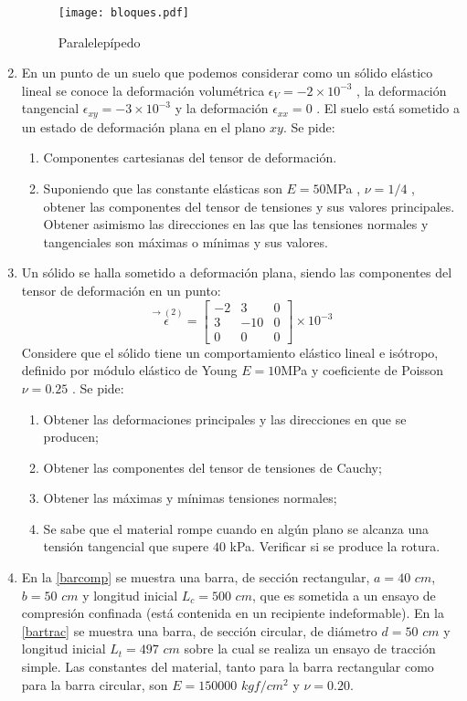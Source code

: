 \documentclass[../notas medios.tex]{subfiles}
\begin{document}
\begin{enumerate}
\begin{figure}[h]
	\centering
	\texttt{[image: bloques.pdf]} 
	\caption{Paralelepípedo}
	\label{bloques}
\end{figure}

\item \label{punto06_m} En un punto de un suelo que podemos considerar como un s\'olido el\'astico lineal se conoce la deformaci\'on volum\'etrica $\epsilon_V = -2\times10^{-3}$ , la deformaci\'on tangencial $\epsilon_{xy} = - 3 \times 10^{-3}$ y la deformaci\'on  $\epsilon_{xx} = 0$ . El suelo est\'a sometido a un estado de deformaci\'on plana en el plano $x y$. Se pide:
\begin{enumerate}
\item Componentes cartesianas del tensor de deformaci\'on. 
\item  Suponiendo que las constante el\'asticas son $E = 50$MPa , $\nu =1/4$ , obtener las componentes del tensor de tensiones y sus valores principales. Obtener asimismo las direcciones en las que las tensiones normales y tangenciales son m\'aximas o m\'inimas y sus valores.
\end{enumerate}

\item \label{punto07_m} Un s\'olido se halla sometido a deformaci\'on plana, siendo las componentes del tensor de deformaci\'on en un punto: 
\[\overset{\rightarrow (2)}\epsilon = \left[ \begin{array}{ccc}
-2 & 3 & 0 \\ 
3 & -10 & 0 \\ 
0 & 0 & 0
\end{array}  \right] \times 10^{-3}\]
Considere que el s\'olido tiene un comportamiento el\'astico lineal e is\'otropo, definido por
m\'odulo el\'astico de Young $E = 10$MPa y coeficiente de Poisson $\nu = 0.25$ .
Se pide:
\begin{enumerate}
\item Obtener las deformaciones principales y las direcciones en que se producen;
\item Obtener las componentes del tensor de tensiones de Cauchy;
\item Obtener las m\'aximas y m\'inimas tensiones normales;
\item Se sabe que el material rompe cuando en alg\'un plano se alcanza una tensi\'on tangencial
que supere $40$ kPa. Verificar si se produce la rotura.
\end{enumerate}

\item \label{punto08_m}  En la \cref{barcomp}  se muestra una barra, de sección rectangular, $a= 40$ $cm$, $b = 50$ $cm$ y longitud inicial $L_{c} = 500$ $cm$, que es  sometida a un ensayo de compresión confinada (está contenida en un recipiente indeformable). En la \cref{bartrac} se muestra una barra, de sección circular, de diámetro $d = 50$ $cm$ y longitud inicial $L_{t} =497$ $cm$ sobre la cual se realiza  un ensayo de tracción simple. Las constantes del material, tanto para la barra rectangular como para la barra circular, son $E=150000$ $kgf/cm^2$ y $\nu=0.20$.


\end{enumerate}
\end{document}
